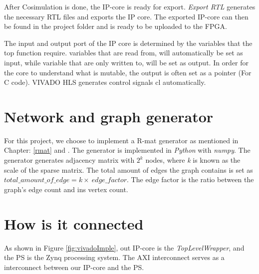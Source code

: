 After Cosimulation is done, the IP-core is ready for export. \textit{Export RTL} generates the necessary RTL files and exports the IP core. The exported IP-core can then be found in the project folder and is ready to be uploaded to the FPGA. 

The input and output port of the IP core is determined by the variables that the top function require. variables that are read from, will automatically be set as input, while variable that are only written to, will be set as output. In order for the core to understand what is mutable, the output is often set as a pointer (For C code). VIVADO HLS generates control signals cl automatically. 

\section{Network and graph generator}

For this project, we choose to implement a R-mat generator as mentioned in Chapter: \ref{rmat} and  \cite{Rmat2004}. The generator is implemented in \textit{Python} \cite{PYTHON} with \textit{numpy}. The generator generates adjacency matrix with $2^k$ nodes, where \textit{k} is known as the scale of the sparse matrix. The total amount of edges the graph contains is set as $total\_amount\_of\_edge = k \times\ edge\_factor $. The edge factor is the ratio between the graph's edge count and ins vertex count\cite{graph500}.



\section{How is it connected}
As shown in Figure \ref{fig:vivadoImple}, out IP-core is the \textit{TopLevelWrapper}, and the PS is the Zynq processing system. The AXI interconnect serves as a interconnect between our IP-core and the PS.

